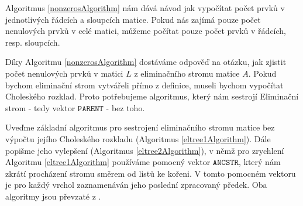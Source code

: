 \documentclass{ctuthesis}
\theoremstyle{plain}
\theoremstyle{definition}
\begin{document}
\begin{figure}[ht]
  \centering
  \begin{minipage}{.5\linewidth}
    \begin{algorithm}[H]
      \SetAlgoNoLine
      

    \end{algorithm}
  \end{minipage}
\end{figure}

Algoritmus \ref{nonzerosAlgorithm} nám dává návod jak vypočítat počet prvků v jednotlivých řádcích a sloupcích matice. Pokud nás zajímá pouze počet nenulových prvků v celé matici, můžeme počítat pouze počet prvků v řádcích, resp. sloupcích.

Díky Algoritmu \ref{nonzerosAlgorithm} dostáváme odpověď na otázku, jak zjistit počet nenulových prvků v matici $L$ z eliminačního stromu matice $A$. Pokud bychom eliminační strom vytvářeli přímo z definice, museli bychom vypočítat Choleského rozklad. Proto potřebujeme algoritmus, který nám sestrojí Eliminační strom - tedy vektor $\texttt{PARENT}$ - bez toho.

Uveďme základní algoritmus pro sestrojení eliminačního stromu matice bez výpočtu jejího Choleského rozkladu (Algoritmus \ref{eltree1Algorithm}). Dále popišme jeho vylepšení (Algoritmus \ref{eltree2Algorithm}), v němž pro zrychlení Algoritmu \ref{eltree1Algorithm} používáme pomocný vektor $\texttt{ANCSTR}$, který nám zkrátí procházení stromu směrem od listů ke kořeni. V tomto pomocném vektoru je pro každý vrchol zaznamenáván jeho poslední zpracovaný předek. Oba algoritmy jsou převzaté z \cite{liu:86}. 
\end{document}
